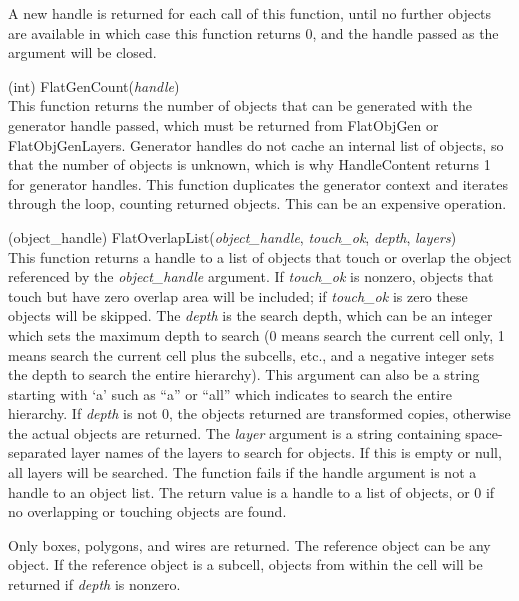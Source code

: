 \begin{description}
A new handle is returned for each call of this function, until no
further objects are available in which case this function returns 0,
and the handle passed as the argument will be closed.

\item{(int) \vt FlatGenCount({\it handle\/})}\\
This function returns the number of objects that can be generated with
the generator handle passed, which must be returned from {\vt
FlatObjGen} or {\vt FlatObjGenLayers}.  Generator handles do not cache
an internal list of objects, so that the number of objects is unknown,
which is why {\vt HandleContent} returns 1 for generator handles. 
This function duplicates the generator context and iterates through
the loop, counting returned objects.  This can be an expensive
operation.

\item{(object\_handle) \vt FlatOverlapList({\it object\_handle},
  {\it touch\_ok}, {\it depth}, {\it layers\/})}\\
This function returns a handle to a list of objects that touch or
overlap the object referenced by the {\it object\_handle} argument. 
If {\it touch\_ok} is nonzero, objects that touch but have zero
overlap area will be included; if {\it touch\_ok} is zero these
objects will be skipped.  The {\it depth} is the search depth, which
can be an integer which sets the maximum depth to search (0 means
search the current cell only, 1 means search the current cell plus the
subcells, etc., and a negative integer sets the depth to search the
entire hierarchy).  This argument can also be a string starting with
`{\vt a}' such as ``{\vt a}'' or ``{\vt all}'' which indicates to
search the entire hierarchy.  If {\it depth} is not 0, the objects
returned are transformed copies, otherwise the actual objects are
returned.  The {\it layer} argument is a string containing
space-separated layer names of the layers to search for objects.  If
this is empty or null, all layers will be searched.  The function
fails if the handle argument is not a handle to an object list.  The
return value is a handle to a list of objects, or 0 if no overlapping
or touching objects are found.

Only boxes, polygons, and wires are returned.  The reference object
can be any object.  If the reference object is a subcell, objects from
within the cell will be returned if {\it depth} is nonzero.

\end{description}


